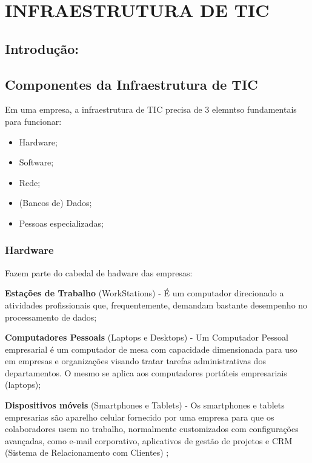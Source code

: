 \documentclass[
]{book}
\begin{document}
\chapter{INFRAESTRUTURA DE TIC}\label{infraestrutura-de-tic}

\section{Introdução:}\label{introduuxe7uxe3o-1}

\section{Componentes da Infraestrutura de TIC}\label{componentes-da-infraestrutura-de-tic}

Em uma empresa, a infraestrutura de TIC precisa de 3 elemntso fundamentais para funcionar:

\begin{itemize}
\item
  Hardware;
\item
  Software;
\item
  Rede;
\item
  (Bancos de) Dados;
\item
  Pessoas especializadas;
\end{itemize}

\subsection{Hardware}\label{hardware}

Fazem parte do cabedal de hadware das empresas:

\textbf{Estações de Trabalho} (WorkStations) - É um computador direcionado a atividades profissionais que, frequentemente, demandam bastante desempenho no processamento de dados;

\textbf{Computadores Pessoais} (Laptops e Desktops) - Um Computador Pessoal empresarial é um computador de mesa com capacidade dimensionada para uso em empresas e organizações visando tratar tarefas administrativas dos departamentos. O mesmo se aplica aos computadores portáteis empresariais (laptops);

\textbf{Dispositivos móveis} (Smartphones e Tablets) - Os smartphones e tablets empresarias são aparelho celular fornecido por uma empresa para que os colaboradores usem no trabalho, normalmente customizados com configurações avançadas, como e-mail corporativo, aplicativos de gestão de projetos e CRM (Sistema de Relacionamento com Clientes) ;
\end{document}
